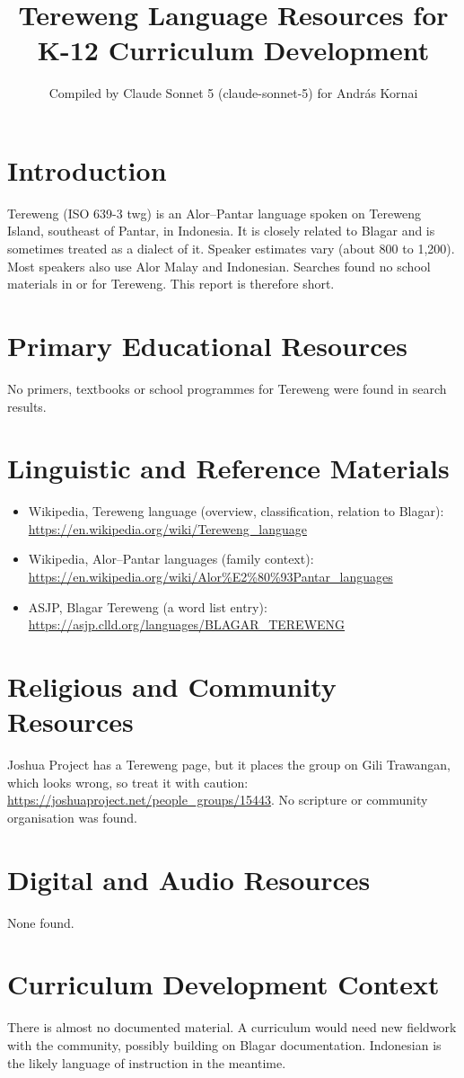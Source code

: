 \documentclass[12pt]{article}
\title{Tereweng Language Resources for K-12 Curriculum Development}
\author{Compiled by Claude Sonnet 5 (claude-sonnet-5) for Andr\'as Kornai}
\date{}
\begin{document}
\maketitle

\section{Introduction}
Tereweng (ISO 639-3 twg) is an Alor--Pantar language spoken on Tereweng Island, southeast of Pantar, in Indonesia. It is closely related to Blagar and is sometimes treated as a dialect of it. Speaker estimates vary (about 800 to 1,200). Most speakers also use Alor Malay and Indonesian. Searches found no school materials in or for Tereweng. This report is therefore short.

\section{Primary Educational Resources}
No primers, textbooks or school programmes for Tereweng were found in search results.

\section{Linguistic and Reference Materials}
\begin{itemize}
\item Wikipedia, Tereweng language (overview, classification, relation to Blagar): \url{https://en.wikipedia.org/wiki/Tereweng_language}
\item Wikipedia, Alor--Pantar languages (family context): \url{https://en.wikipedia.org/wiki/Alor%E2%80%93Pantar_languages}
\item ASJP, Blagar Tereweng (a word list entry): \url{https://asjp.clld.org/languages/BLAGAR_TEREWENG}
\end{itemize}

\section{Religious and Community Resources}
Joshua Project has a Tereweng page, but it places the group on Gili Trawangan, which looks wrong, so treat it with caution: \url{https://joshuaproject.net/people_groups/15443}. No scripture or community organisation was found.

\section{Digital and Audio Resources}
None found.

\section{Curriculum Development Context}
There is almost no documented material. A curriculum would need new fieldwork with the community, possibly building on Blagar documentation. Indonesian is the likely language of instruction in the meantime.
\end{document}
